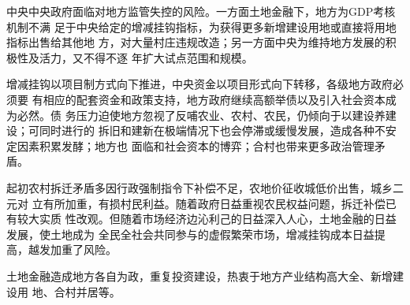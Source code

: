 中央中央政府面临对地方监管失控的风险。一方面土地金融下，地方为GDP考核机制不满
足于中央给定的增减挂钩指标，为获得更多新增建设用地或直接将用地指标出售给其他地
方，对大量村庄违规改造；另一方面中央为维持地方发展的积极性及活力，又不得不逐
年扩大试点范围和规模。

增减挂钩以项目制方式向下推进，中央资金以项目形式向下转移，各级地方政府必须要
有相应的配套资金和政策支持，地方政府继续高额举债以及引入社会资本成为必然。债
务压力迫使地方忽视了反哺农业、农村、农民，仍倾向于以建设养建设；可同时进行的
拆旧和建新在极端情况下也会停滞或缓慢发展，造成各种不安定因素积累发酵；地方也
面临和社会资本的博弈；合村也带来更多政治管理矛盾。

起初农村拆迁矛盾多因行政强制指令下补偿不足，农地价征收城低价出售，城乡二元对
立有所加重，有损村民利益。随着政府日益重视农民权益问题，拆迁补偿已有较大实质
性改观。但随着市场经济边沁利己的日益深入人心，土地金融的日益发展，使土地成为
全民全社会共同参与的虚假繁荣市场，增减挂钩成本日益提高，越发加重了风险。


土地金融造成地方各自为政，重复投资建设，热衷于地方产业结构高大全、新增建设用
地、合村并居等。












